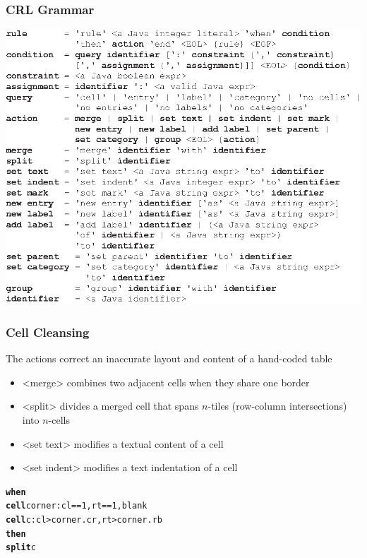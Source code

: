 \documentclass[10pt]{beamer}
\begin{document}
\begin{frame}
\frametitle{CRL Grammar}
\includegraphics[width=0.75\linewidth]{BNF}
\end{frame}

\begin{frame}[fragile]
\frametitle{Cell Cleansing}
The actions correct an inaccurate layout and content of a hand-coded table
\begin{itemize}
	\item \alert{<merge>} combines two adjacent cells when they share one border
	\item \alert{<split>} divides a merged cell that spans $n$-tiles (row-column intersections) into $n$-cells
	\item \alert{<set text>} modifies a textual content of a cell
	\item \alert{<set indent>} modifies a text indentation of a cell
\end{itemize}
\footnotesize{
\begin{example}
\begin{alltt}
\textbf{when}
  \textbf{cell} corner: cl == 1, rt == 1, blank
  \textbf{cell} c: cl > corner.cr, rt > corner.rb
\textbf{then}
  \textbf{split} c
\end{alltt}
\end{example}
}
\end{frame}
\end{document}
